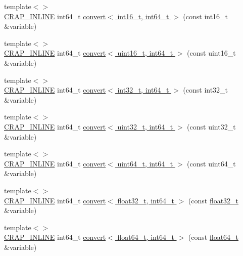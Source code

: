 \begin{DoxyCompactItemize}
\item 
{\footnotesize template$<$$>$ }\\\hyperlink{config__x86_8h_a5a40526b8d842e7ff731509998bb0f1c}{C\+R\+A\+P\+\_\+\+I\+N\+L\+I\+N\+E} int64\+\_\+t \hyperlink{namespacecrap_af7ccd568188e7b5ee1164ea95909ac05}{convert$<$ int16\+\_\+t, int64\+\_\+t $>$} (const int16\+\_\+t \&variable)
\item 
{\footnotesize template$<$$>$ }\\\hyperlink{config__x86_8h_a5a40526b8d842e7ff731509998bb0f1c}{C\+R\+A\+P\+\_\+\+I\+N\+L\+I\+N\+E} int64\+\_\+t \hyperlink{namespacecrap_abd610895fae7923806a965f88dc4a333}{convert$<$ uint16\+\_\+t, int64\+\_\+t $>$} (const uint16\+\_\+t \&variable)
\item 
{\footnotesize template$<$$>$ }\\\hyperlink{config__x86_8h_a5a40526b8d842e7ff731509998bb0f1c}{C\+R\+A\+P\+\_\+\+I\+N\+L\+I\+N\+E} int64\+\_\+t \hyperlink{namespacecrap_a81b4c11d3612bd0b0c5ad198a19cc7e0}{convert$<$ int32\+\_\+t, int64\+\_\+t $>$} (const int32\+\_\+t \&variable)
\item 
{\footnotesize template$<$$>$ }\\\hyperlink{config__x86_8h_a5a40526b8d842e7ff731509998bb0f1c}{C\+R\+A\+P\+\_\+\+I\+N\+L\+I\+N\+E} int64\+\_\+t \hyperlink{namespacecrap_a885bb705d208a4a942f7f24ff683bc29}{convert$<$ uint32\+\_\+t, int64\+\_\+t $>$} (const uint32\+\_\+t \&variable)
\item 
{\footnotesize template$<$$>$ }\\\hyperlink{config__x86_8h_a5a40526b8d842e7ff731509998bb0f1c}{C\+R\+A\+P\+\_\+\+I\+N\+L\+I\+N\+E} int64\+\_\+t \hyperlink{namespacecrap_aebbb93efdc4b9b84912b1e9d28900597}{convert$<$ uint64\+\_\+t, int64\+\_\+t $>$} (const uint64\+\_\+t \&variable)
\item 
{\footnotesize template$<$$>$ }\\\hyperlink{config__x86_8h_a5a40526b8d842e7ff731509998bb0f1c}{C\+R\+A\+P\+\_\+\+I\+N\+L\+I\+N\+E} int64\+\_\+t \hyperlink{namespacecrap_a3266b6a23484cef532b7ef2b13b301fa}{convert$<$ float32\+\_\+t, int64\+\_\+t $>$} (const \hyperlink{crap__types_8h_a4611b605e45ab401f02cab15c5e38715}{float32\+\_\+t} \&variable)
\item 
{\footnotesize template$<$$>$ }\\\hyperlink{config__x86_8h_a5a40526b8d842e7ff731509998bb0f1c}{C\+R\+A\+P\+\_\+\+I\+N\+L\+I\+N\+E} int64\+\_\+t \hyperlink{namespacecrap_aaffe171bbc19487ed1159c087ee53aae}{convert$<$ float64\+\_\+t, int64\+\_\+t $>$} (const \hyperlink{crap__types_8h_ac55f3ae81b5bc9053760baacf57e47f4}{float64\+\_\+t} \&variable)

\end{DoxyCompactItemize}
